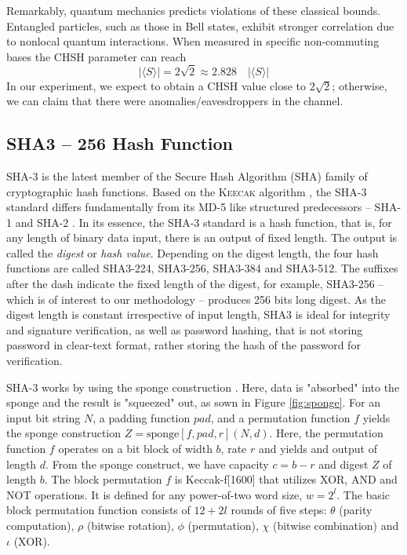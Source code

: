 \documentclass[a4paper]{cas-sc}
\begin{document}
Remarkably, quantum mechanics predicts violations of these classical bounds. Entangled particles, such as those in Bell states, exhibit stronger correlation due to nonlocal quantum interactions. When measured in specific non-commuting bases the CHSH parameter can reach
\[
    \left| \langle S \rangle \right| = 2\sqrt{2} \approx 2.828 \quad \left| \langle S \rangle \right|
\]
In our experiment, we expect to obtain a CHSH value close to \( 2\sqrt{2} \); otherwise, we can claim that there were anomalies/eavesdroppers in the channel.
\subsection{SHA3 -- 256 Hash Function}
\label{sec:sha3}
SHA-3 is the latest member \cite{nistHashFunctions} of the Secure Hash Algorithm (SHA) family of cryptographic hash functions. Based on the K\textsc{eecak} algorithm \cite{Bbbbbbb2011}, the SHA-3 standard differs fundamentally from its MD-5 \cite{rivest1992md5} like structured predecessors -- SHA-1 and SHA-2 \cite{penard2008secure}. In its essence, the SHA-3 standard is a hash function, that is, for any length of binary data input, there is an output of fixed length. The output is called the \textit{digest} or \textit{hash value}. Depending on the digest length, the four hash functions are called SHA3-224, SHA3-256, SHA3-384 and SHA3-512. The suffixes after the dash indicate the fixed length of the digest, for example, SHA3-256 -- which is of interest to our methodology -- produces 256 bits long digest. As the digest length is constant irrespective of input length, SHA3 is ideal for integrity and signature verification, as well as password hashing, that is not storing password in clear-text format, rather storing the hash of the password for verification.

SHA-3 works by using the sponge construction \cite{keccakKeccakTeam}. Here, data is "absorbed" into the sponge and the result is "squeezed" out, as sown in Figure \ref{fig:sponge}. For an input bit string $N$, a padding function $pad$, and a permutation function $f$ yields the sponge construction $Z=\text{sponge}[f,pad,r](N,d)$. Here, the permutation function $f$ operates on a bit block of width $b$, rate $r$ and yields and output of length $d$. From the sponge construct, we have capacity $c=b-r$ and digest $Z$ of length $b$. The block permutation $f$ is Keccak-f[1600] that utilizes XOR, AND and NOT operations. It is defined for any power-of-two word size, $w=2^l$. The basic block permutation function consists of $12+2l$ rounds of five steps: $\theta$ (parity computation), $\rho$ (bitwise rotation), $\phi$ (permutation), $\chi$ (bitwise combination) and $\iota$ (XOR).
\end{document}
